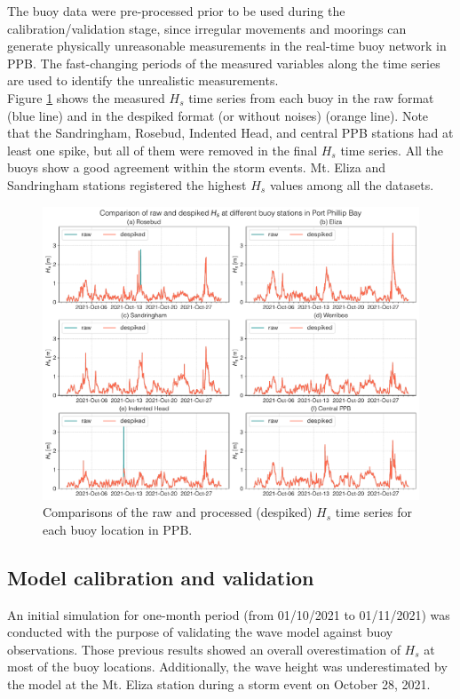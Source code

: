 \documentclass[12pt]{article}
\begin{document}
The buoy data were pre-processed prior to be used during the calibration/validation stage, since irregular movements and moorings can generate physically unreasonable measurements in the real-time buoy network in PPB. The fast-changing periods of the measured variables along the time series are used to identify the unrealistic measurements.\\

Figure \ref{fig:pre_processing} shows the  measured $H_{s}$ time series  from each buoy in the raw format (blue line) and in the despiked format (or without noises) (orange line). Note that the Sandringham, Rosebud, Indented Head, and central PPB stations had at least one spike, but all of them were removed in the final $H_{s}$ time series.  All the buoys show a good agreement within the storm events. Mt. Eliza and Sandringham stations registered the highest $H_{s}$ values among all the datasets.

\begin{figure}[h]
    \centering
    \includegraphics[scale=0.5]{plots/maps/buoy_despiked.pdf}
    \caption{Comparisons of the raw and processed (despiked) $H_{s}$ time series for each buoy location in PPB.}
    \label{fig:pre_processing}
\end{figure}

\subsection{Model calibration and validation}

An initial simulation for one-month period (from 01/10/2021 to 01/11/2021) was conducted with the purpose of validating the wave model against buoy observations. Those previous results showed an overall overestimation of $H_{s}$ at most of the buoy locations. Additionally, the wave height was underestimated by the model at the Mt. Eliza station during a storm event on October 28, 2021.
\end{document}
